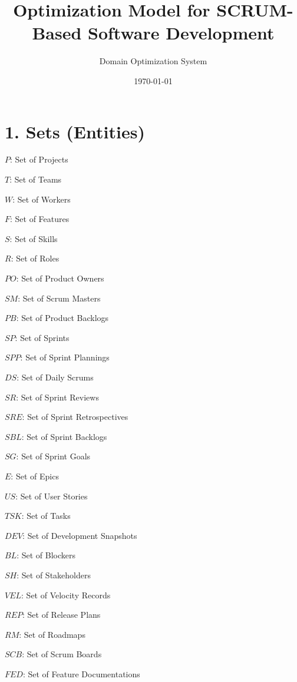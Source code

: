 \documentclass[12pt]{article}
\title{Optimization Model for SCRUM-Based Software Development}
\author{Domain Optimization System}
\date{\today}
\begin{document}
\maketitle
\tableofcontents
\newpage

\section{1. Sets (Entities)}
\item $ P $: Set of Projects
    \item $ T $: Set of Teams
    \item $ W $: Set of Workers
    \item $ F $: Set of Features
    \item $ S $: Set of Skills
    \item $ R $: Set of Roles
    \item $ PO $: Set of Product Owners
    \item $ SM $: Set of Scrum Masters
    \item $ PB $: Set of Product Backlogs
    \item $ SP $: Set of Sprints
    \item $ SPP $: Set of Sprint Plannings
    \item $ DS $: Set of Daily Scrums
    \item $ SR $: Set of Sprint Reviews
    \item $ SRE $: Set of Sprint Retrospectives
    \item $ SBL $: Set of Sprint Backlogs
    \item $ SG $: Set of Sprint Goals
    \item $ E $: Set of Epics
    \item $ US $: Set of User Stories
    \item $ TSK $: Set of Tasks
    \item $ DEV $: Set of Development Snapshots
    \item $ BL $: Set of Blockers
    \item $ SH $: Set of Stakeholders
    \item $ VEL $: Set of Velocity Records
    \item $ REP $: Set of Release Plans
    \item $ RM $: Set of Roadmaps
    \item $ SCB $: Set of Scrum Boards
    \item $ FED $: Set of Feature Documentations
\end{document}
